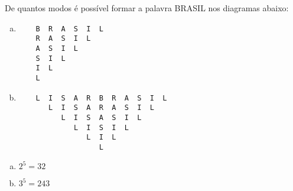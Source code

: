 \begin{ex}
 	De quantos modos é possível formar a palavra BRASIL nos diagramas abaixo:   
    \begin{enumerate}[(a)]
    \item
    \begin{verbatim}
    B  R  A  S  I  L
    R  A  S  I  L
    A  S  I  L 
    S  I  L 
    I  L
    L
    \end{verbatim}       
    \item 
    \begin{verbatim}
    L  I  S  A  R  B  R  A  S  I  L
       L  I  S  A  R  A  S  I  L
          L  I  S  A  S  I  L
             L  I  S  I  L
                L  I  L
                   L
    \end{verbatim}
    \end{enumerate}  
      \begin{sol}
         \phantom{A}
           \begin{enumerate} [(a)]
               \item $2^5=32$
               \item $3^5=243$
           \end{enumerate}
      \end{sol}
\end{ex}